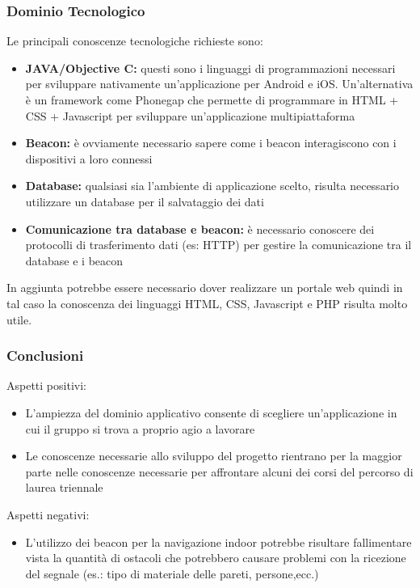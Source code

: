 \subsubsection{Dominio Tecnologico}
Le principali conoscenze tecnologiche richieste sono:

\begin{itemize}
	\item \textbf{JAVA/Objective C:} questi sono i linguaggi di programmazioni necessari per sviluppare nativamente un'applicazione per Android e iOS. Un'alternativa è un framework come Phonegap che 
	permette di programmare in HTML + CSS + Javascript per sviluppare un'applicazione multipiattaforma
	\item \textbf{Beacon:} è ovviamente necessario sapere come i beacon interagiscono con i dispositivi a loro connessi
	\item \textbf{Database:} qualsiasi sia l'ambiente di applicazione scelto, risulta necessario utilizzare un database per il salvataggio dei dati
	\item \textbf{Comunicazione tra database e beacon:} è necessario conoscere dei protocolli di trasferimento dati (es: HTTP) per gestire la comunicazione tra il database e i beacon
\end{itemize}

In aggiunta potrebbe essere necessario dover realizzare un portale web quindi in tal caso la conoscenza dei linguaggi HTML, CSS, Javascript e PHP risulta molto utile.


\subsubsection{Conclusioni}

Aspetti positivi:

\begin{itemize}
	\item L'ampiezza del dominio applicativo consente di scegliere un'applicazione in cui il gruppo si trova a proprio agio a lavorare
	\item Le conoscenze necessarie allo sviluppo del progetto rientrano per la maggior parte nelle conoscenze necessarie per affrontare alcuni dei corsi
	del percorso di laurea triennale
\end{itemize}

Aspetti negativi:

\begin{itemize}
	\item L'utilizzo dei beacon per la navigazione indoor potrebbe risultare fallimentare vista la quantità di ostacoli che potrebbero causare problemi con 
	la ricezione del segnale (es.: tipo di materiale delle pareti, persone,ecc.)
\end{itemize}